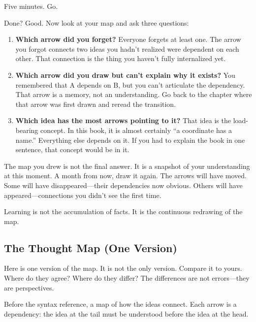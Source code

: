 \documentclass[11pt,titlepage]{article}
\begin{document}
Five minutes. Go.

\vspace{2em}

Done? Good. Now look at your map and ask three questions:

\begin{enumerate}
\def\labelenumi{\arabic{enumi}.}
\item
  \textbf{Which arrow did you forget?} Everyone forgets at least one.
  The arrow you forgot connects two ideas you hadn't realized were
  dependent on each other. That connection is the thing you haven't
  fully internalized yet.
\item
  \textbf{Which arrow did you draw but can't explain why it exists?} You
  remembered that A depends on B, but you can't articulate the
  dependency. That arrow is a memory, not an understanding. Go back to
  the chapter where that arrow was first drawn and reread the
  transition.
\item
  \textbf{Which idea has the most arrows pointing to it?} That idea is
  the load-bearing concept. In this book, it is almost certainly ``a
  coordinate has a name.'' Everything else depends on it. If you had to
  explain the book in one sentence, that concept would be in it.
\end{enumerate}

The map you drew is not the final answer. It is a snapshot of your
understanding at this moment. A month from now, draw it again. The
arrows will have moved. Some will have disappeared---their dependencies
now obvious. Others will have appeared---connections you didn't see the
first time.

Learning is not the accumulation of facts. It is the continuous
redrawing of the map.

\vspace{2em}

\hypertarget{the-thought-map-one-version}{%
\subsection{The Thought Map (One
Version)}\label{the-thought-map-one-version}}

Here is one version of the map. It is not the only version. Compare it
to yours. Where do they agree? Where do they differ? The differences are
not errors---they are perspectives.

Before the syntax reference, a map of how the ideas connect. Each arrow
is a dependency: the idea at the tail must be understood before the idea
at the head.
\end{document}
